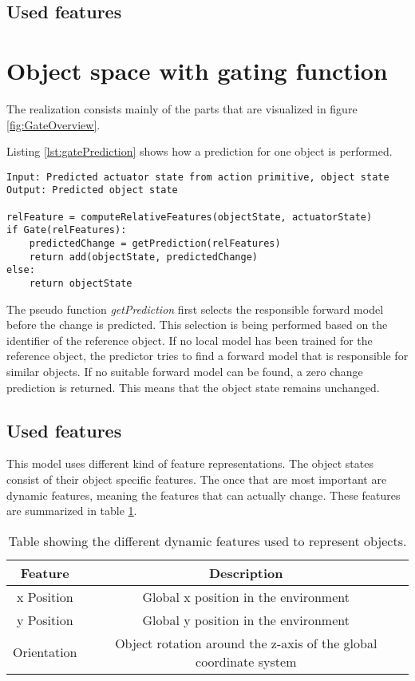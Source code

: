 \subsection{Used features \label{sec:intFeatures}}



\section{Object space with gating function \label{sec:gateRealization}}

The realization consists mainly of the parts that are visualized in figure \ref{fig:GateOverview}. 

Listing \ref{lst:gatePrediction} shows how a prediction for one object is performed. 

\begin{lstlisting}[caption={Prediction pseudocode.},label=lst:gatePrediction]
Input: Predicted actuator state from action primitive, object state
Output: Predicted object state

relFeature = computeRelativeFeatures(objectState, actuatorState)
if Gate(relFeatures):
	predictedChange = getPrediction(relFeatures)
	return add(objectState, predictedChange)
else:
	return objectState
\end{lstlisting}

The pseudo function \textit{getPrediction} first selects the responsible forward model before the change is predicted. This selection is being performed based on the identifier of the reference object. If no local model has been trained for the reference object, the predictor tries to find a forward model that is responsible for similar objects. If no suitable forward model can be found, a zero change prediction is returned. This means that the object state remains unchanged.


\subsection{Used features}

This model uses different kind of feature representations. The object states consist of their object specific features. The once that are most important are dynamic features, meaning the features that can actually change. These features are summarized in table \ref{tab:gateObjectFeatures}.

\begin{table}
	\centering
	\begin{tabular}{|c|c|}
		\hline Feature & Description \\ 
		\hline x Position & Global x position in the environment \\ 
		\hline y Position & Global y position in the environment \\ 
		\hline Orientation & Object rotation around the z-axis of the global coordinate system \\ 
		\hline 
	\end{tabular} 
	\caption{Table showing the different dynamic features used to represent objects.}
	\label{tab:gateObjectFeatures}
\end{table}

